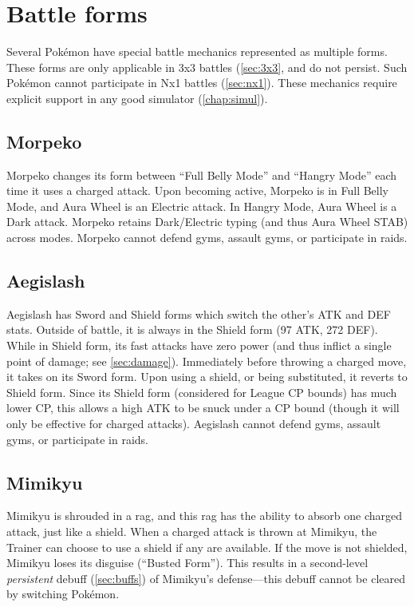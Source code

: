 \section{Battle forms\label{sec:battleforms}}
Several Pokémon have special battle mechanics represented as multiple forms.
These forms are only applicable in 3x3 battles (\autoref{sec:3x3}, and do not
persist. Such Pokémon cannot participate in Nx1 battles (\autoref{sec:nx1}).
These mechanics require explicit support in any good simulator (\autoref{chap:simul}).

\subsection{Morpeko\label{subsec:Morpeko}}
Morpeko changes its form between ``Full Belly Mode'' and ``Hangry Mode''
  each time it uses a charged attack.
Upon becoming active, Morpeko is in Full Belly Mode, and Aura Wheel is an Electric attack.
In Hangry Mode, Aura Wheel is a Dark attack.
Morpeko retains Dark/Electric typing (and thus Aura Wheel STAB) across modes.
Morpeko cannot defend gyms, assault gyms, or participate in raids.

\subsection{Aegislash\label{subsec:Aegislash}}
Aegislash has Sword and Shield forms which switch the other's ATK and DEF stats.
Outside of battle, it is always in the Shield form (97 ATK, 272 DEF).
While in Shield form, its fast attacks have zero power (and thus inflict
  a single point of damage; see \autoref{sec:damage}).
Immediately before throwing a charged move, it takes on its Sword form.
Upon using a shield, or being substituted, it reverts to Shield form.
Since its Shield form (considered for League CP bounds) has much lower CP,
 this allows a high ATK to be snuck under a CP bound (though it will only
 be effective for charged attacks).
Aegislash cannot defend gyms, assault gyms, or participate in raids.

\subsection{Mimikyu\label{subsec:Mimikyu}}
Mimikyu is shrouded in a rag, and this rag has the ability to absorb one charged attack,
just like a shield. When a charged attack is thrown at Mimikyu, the Trainer can choose
to use a shield if any are available. If the move is not shielded, Mimikyu loses its
disguise (``Busted Form''). This results in a second-level \textit{persistent} debuff (\ref{sec:buffs})
of Mimikyu's defense---this debuff cannot be cleared by switching Pokémon.

